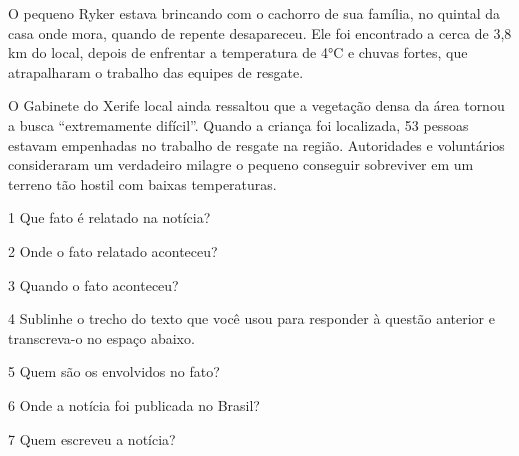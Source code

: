 \begin{conteudo}
\begin{conteudo}
\begin{conteudo}
\begin{conteudo}
\begin{myquote}
O pequeno Ryker estava brincando com o cachorro de sua família, no
quintal da casa onde mora, quando de repente desapareceu. Ele foi
encontrado a cerca de 3,8 km do local, depois de enfrentar a temperatura
de 4°C e chuvas fortes, que atrapalharam o trabalho das equipes de
resgate.

O Gabinete do Xerife local ainda ressaltou que a vegetação densa da área
tornou a busca ``extremamente difícil''. Quando a criança foi
localizada, 53 pessoas estavam empenhadas no trabalho
de resgate na
região. Autoridades e voluntários consideraram um verdadeiro milagre o
pequeno conseguir sobreviver em um terreno tão hostil com baixas
temperaturas.

\end{myquote}

\pagebreak
\num{1} Que fato é relatado na notícia?


\num{2} Onde o fato relatado aconteceu?


\num{3} Quando o fato aconteceu?


\num{4} Sublinhe o trecho do texto que você usou para responder à questão anterior e transcreva-o no espaço abaixo.


\num{5} Quem são os envolvidos no fato?


\num{6} Onde a notícia foi publicada no Brasil?


\num{7} Quem escreveu a notícia?


\end{conteudo}
\end{conteudo}
\end{conteudo}
\end{conteudo}
